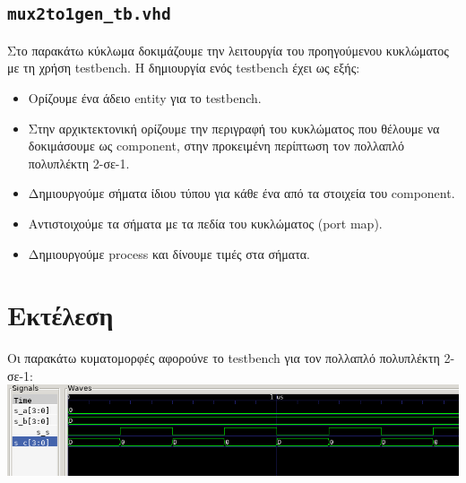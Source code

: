 \documentclass{article}
\begin{document}

\pagebreak

\subsection{\lstinline{mux2to1gen_tb.vhd}}

Στο παρακάτω κύκλωμα δοκιμάζουμε την λειτουργία του προηγούμενου κυκλώματος
με τη χρήση testbench. Η δημιουργία ενός testbench έχει ως εξής:
\begin{itemize}
	\item Ορίζουμε ένα άδειο entity για το testbench.
	\item Στην αρχικτεκτονική ορίζουμε την περιγραφή του κυκλώματος
		που θέλουμε να δοκιμάσουμε ως component, στην προκειμένη 
		περίπτωση τον πολλαπλό πολυπλέκτη 2-σε-1.
	\item Δημιουργούμε σήματα ίδιου τύπου για κάθε ένα από τα στοιχεία του
		component.
	\item Αντιστοιχούμε τα σήματα με τα πεδία του κυκλώματος (port map).
	\item Δημιουργούμε process και δίνουμε τιμές στα σήματα.
\end{itemize}


\pagebreak

\section{Εκτέλεση}

Οι παρακάτω κυματομορφές αφορούνε το testbench για τον πολλαπλό πολυπλέκτη 2-σε-1: \\

\includegraphics[width=\textwidth]{res/mux2to1gen.png}
\end{document}
